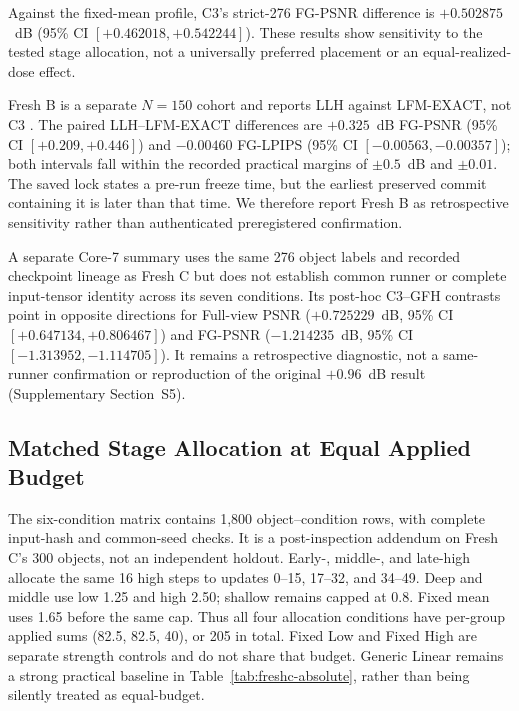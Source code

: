 \documentclass[times,twocolumn,final]{elsarticle}
\providecommand{\DIFadd}[1]{{\protect\color{blue} \sf #1}} %
\providecommand{\DIFaddbegin}{} %
\providecommand{\DIFaddend}{} %
\providecommand{\DIFaddFL}[1]{\DIFadd{#1}} %
\providecommand{\DIFaddbeginFL}{\DIFaddbegin} %
\renewcommand{\DIFaddbeginFL}{}
\renewcommand{\DIFaddFL}[1]{#1}
\begin{document}
  \DIFaddbegin \DIFadd{Against the fixed-mean profile, }\DIFaddend C3's   \DIFaddbegin \DIFadd{strict-276 FG-PSNR difference is $+0.502875$~dB (95\% CI $[+0.462018,+0.542244]$). These results show sensitivity to the tested stage allocation, not a universally preferred placement or an equal-realized-dose effect.
}\DIFaddend 

  \DIFaddbegin \DIFadd{Fresh B is a separate $N=150$ cohort and reports LLH against LFM-EXACT, not }\DIFaddend C3  \DIFaddbegin \DIFadd{. The paired LLH--LFM-EXACT differences are $+0.325$~dB FG-PSNR (95\% CI $[+0.209,+0.446]$) and $-0.00460$ FG-LPIPS (95\% CI $[-0.00563,-0.00357]$); both intervals fall within the recorded practical margins of $\pm0.5$~dB and $\pm0.01$. The saved lock states a pre-run freeze time, but the earliest preserved commit containing it is later than that time. We therefore report Fresh B as retrospective sensitivity rather than authenticated preregistered confirmation}\DIFaddend .

  \DIFaddbegin \DIFadd{A separate Core-7 summary uses the same 276 object labels and recorded checkpoint lineage as Fresh C but does not establish common runner or complete input-tensor identity across its seven conditions. Its post-hoc C3--GFH contrasts point in opposite directions for Full-view PSNR ($+0.725229$~dB, 95\% CI $[+0.647134,+0.806467]$) and FG-PSNR ($-1.214235$~dB, 95\% CI $[-1.313952,-1.114705]$). It remains a retrospective diagnostic, not a same-runner confirmation or reproduction of the original $+0.96$~dB result (Supplementary Section~S5).
}\DIFaddend 

  \DIFaddbeginFL \subsection{Matched Stage Allocation at Equal Applied Budget}
\label{subsec:matched-budget300}
\DIFaddFL{The six-condition matrix contains 1,800 object--condition rows, with complete input-hash and common-seed checks. It is a post-inspection addendum on Fresh C's 300 objects, not an independent holdout. Early-, middle-, and late-high allocate the same 16 high steps to updates 0--15, 17--32, and 34--49. Deep and middle use low 1.25 and high 2.50; shallow remains capped at 0.8. Fixed mean uses 1.65 before the same cap. Thus all four allocation conditions have per-group applied sums (82.5, 82.5, 40), or 205 in total. Fixed Low and Fixed High are separate strength controls and do not share that budget. Generic Linear remains a strong practical baseline in Table~\ref{tab:freshc-absolute}, rather than being silently treated as equal-budget.
}
\end{document}

